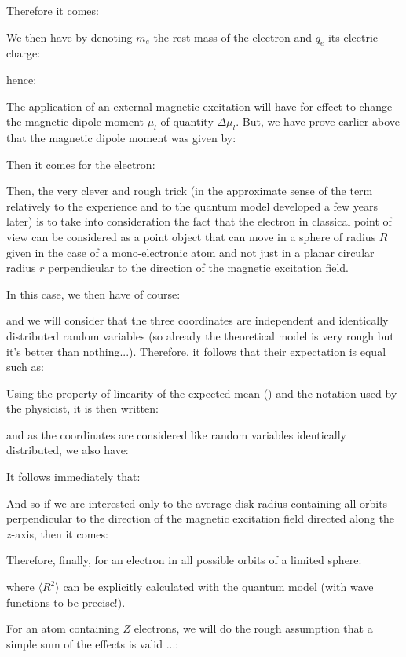 	Therefore it comes:
	
	We then have by denoting $m_e$ the rest mass of the electron and $q_e$ its electric charge:
	
	hence:
	
	The application of an external magnetic excitation will have for effect to change the magnetic dipole moment $\mu_l$ of quantity $\Delta \mu_l$. But, we have prove earlier above that the magnetic dipole moment was given by:
	
	Then it comes for the electron:
	
	Then, the very clever and rough trick (in the approximate sense of the term relatively to the experience and to the quantum model developed a few years later) is to take into consideration the fact that the electron in classical point of view can be considered as a point object that can move in a sphere of radius $R$ given in the case of a mono-electronic atom and not just in a planar circular radius $r$ perpendicular to the direction of the magnetic excitation field.

	In this case, we then have of course:
	
	and we will consider that the three coordinates are independent and identically distributed random variables (so already the theoretical model is very rough but it's better than nothing...). Therefore, it follows that their expectation is equal such as:
	
	Using the property of linearity of the expected mean () and the notation used by the physicist, it is then written:
	
	and as the coordinates are considered like random variables identically distributed, we also have:
	
	It follows immediately that:
	
	And so if we are interested only to the average  disk radius containing all orbits perpendicular to the direction of the magnetic excitation field directed along the $z$-axis, then it comes:
	
	Therefore, finally, for an electron in all possible orbits of a limited sphere:
	
	where $\langle R^2 \rangle$ can be explicitly calculated with the quantum model (with wave functions to be precise!).

	For an atom containing $Z$ electrons, we will do the rough assumption that a simple sum of the effects is valid ...:
	
